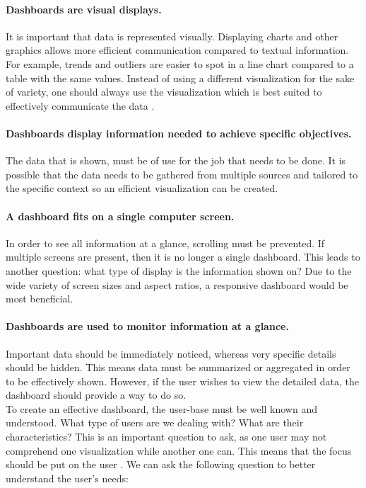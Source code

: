    \paragraph{Dashboards are visual displays.} It is important that data is represented visually. Displaying charts and other graphics allows more efficient communication compared to textual information. For example, trends and outliers are easier to spot in a line chart compared to a table with the same values. Instead of using a different visualization for the sake of variety, one should always use the visualization which is best suited to effectively communicate the data \cite{few2005intelligent}.

    \paragraph{Dashboards display information needed to achieve specific objectives.} The data that is shown, must be of use for the job that needs to be done. It is possible that the data needs to be gathered from multiple sources and tailored to the specific context so an efficient visualization can be created.

    \paragraph{A dashboard fits on a single computer screen.} In order to see all information at a glance, scrolling must be prevented. If multiple screens are present, then it is no longer a single dashboard. This leads to another question: what type of display is the information shown on? Due to the wide variety of screen sizes and aspect ratios, a responsive dashboard would be most beneficial.

    \paragraph{Dashboards are used to monitor information at a glance.} Important data should be immediately noticed, whereas very specific details should be hidden. This means data must be summarized or aggregated in order to be effectively shown. However, if the user wishes to view the detailed data, the dashboard should provide a way to do so.\\

    \noindent To create an effective dashboard, the user-base must be well known and understood. What type of users are we dealing with? What are their characteristics? This is an important question to ask, as one user may not comprehend one visualization while another one can. This means that the focus should be put on the user \cite{brath2004dashboard}. We can ask the following question to better understand the user's needs:
    
